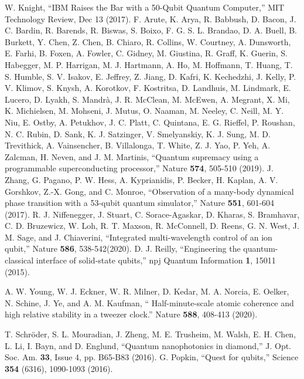 \documentclass{osa-article}
\begin{document}
\begin{thebibliography}{99}
 W. Knight, {} ``IBM Raises the Bar with a 50-Qubit Quantum Computer,'' MIT Technology Review, Dec 13 (2017).
 F. Arute, K. Arya, R. Babbush, D. Bacon, J. C. Bardin, R. Barends, R. Biswas, S. Boixo, F. G. S. L. Brandao, D. A. Buell, B. Burkett, Y. Chen, Z. Chen, B. Chiaro, R. Collins, W. Courtney, A. Dunsworth, E. Farhi, B. Foxen, A. Fowler, C. Gidney, M. Giustina, R. Graff, K. Guerin, S. Habegger, M. P. Harrigan, M. J. Hartmann, A. Ho, M. Hoffmann, T. Huang, T. S. Humble, S. V. Isakov, E. Jeffrey, Z. Jiang, D. Kafri, K. Kechedzhi, J. Kelly, P. V. Klimov, S. Knysh, A. Korotkov, F. Kostritsa, D. Landhuis, M. Lindmark, E. Lucero, D. Lyakh, S. Mandr{\`a}, J. R. McClean, M. McEwen, A. Megrant, X. Mi, K. Michielsen, M. Mohseni, J. Mutus, O. Naaman, M. Neeley, C. Neill, M. Y. Niu, E. Ostby, A. Petukhov, J. C. Platt, C. Quintana, E. G. Rieffel, P. Roushan, N. C. Rubin, D. Sank, K. J. Satzinger, V. Smelyanskiy, K. J. Sung, M. D. Trevithick, A. Vainsencher, B. Villalonga, T. White, Z. J. Yao, P. Yeh, A. Zalcman, H. Neven, and J. M. Martinis, {} ``Quantum supremacy using a programmable superconducting processor,'' Nature \textbf{574}, 505-510 (2019).
 J. Zhang, G. Pagano, P. W. Hess, A. Kyprianidis, P. Becker, H. Kaplan, A. V. Gorshkov, Z.-X. Gong, and C. Monroe, {} ``Observation of a many-body dynamical phase transition with a 53-qubit quantum simulator,'' Nature \textbf{551}, 601-604 (2017).
 R. J. Niffenegger, J. Stuart, C. Sorace-Agaskar, D. Kharas, S. Bramhavar, C. D. Bruzewicz, W. Loh, R. T. Maxson, R. McConnell, D. Reens, G. N. West, J. M. Sage, and J. Chiaverini, {} ``Integrated multi-wavelength control of an ion qubit,'' Nature \textbf{586}, 538-542(2020).
 D. J. Reilly, {} ``Engineering the quantum-classical interface of solid-state qubits,'' npj Quantum Information \textbf{1}, 15011 (2015).

 A. W. Young, W. J. Eckner, W. R. Milner, D. Kedar, M. A. Norcia, E. Oelker, N. Schine, J. Ye, and A. M. Kaufman, {} `` Half-minute-scale atomic coherence and high relative stability in a tweezer clock.'' Nature \textbf{588}, 408-413 (2020).

 T. Schr{\"o}der, S. L. Mouradian, J. Zheng, M. E. Trusheim, M. Walsh, E. H. Chen, L. Li, I. Bayn, and D. Englund, {} ``Quantum nanophotonics in diamond,'' J. Opt. Soc. Am. \textbf{33}, Issue 4, pp. B65-B83 (2016).
 G. Popkin, {}``Quest for qubits,'' Science \textbf{354} (6316), 1090-1093 (2016).


\end{thebibliography}
\end{document}

